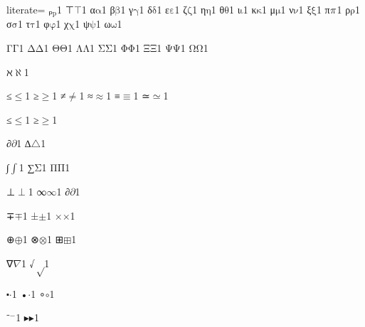 {%
literate=
{ₚ}{{\ensuremath{_\mathrm{p}}}}1
{⊤}{{\ensuremath{\top}}}1
{α}{{\ensuremath{\mathrm{\alpha}}}}1
{β}{{\ensuremath{\mathrm{\beta}}}}1
{γ}{{\ensuremath{\mathrm{\gamma}}}}1
{δ}{{\ensuremath{\mathrm{\delta}}}}1
{ε}{{\ensuremath{\mathrm{\varepsilon}}}}1
{ζ}{{\ensuremath{\mathrm{\zeta}}}}1
{η}{{\ensuremath{\mathrm{\eta}}}}1
{θ}{{\ensuremath{\mathrm{\theta}}}}1
{ι}{{\ensuremath{\mathrm{\iota}}}}1
{κ}{{\ensuremath{\mathrm{\kappa}}}}1
{μ}{{\ensuremath{\mathrm{\mu}}}}1
{ν}{{\ensuremath{\mathrm{\nu}}}}1
{ξ}{{\ensuremath{\mathrm{\xi}}}}1
{π}{{\ensuremath{\mathrm{\mathnormal{\pi}}}}}1
{ρ}{{\ensuremath{\mathrm{\rho}}}}1
{σ}{{\ensuremath{\mathrm{\sigma}}}}1
{τ}{{\ensuremath{\mathrm{\tau}}}}1
{φ}{{\ensuremath{\mathrm{\varphi}}}}1
{χ}{{\ensuremath{\mathrm{\chi}}}}1
{ψ}{{\ensuremath{\mathrm{\psi}}}}1
{ω}{{\ensuremath{\mathrm{\omega}}}}1

{Γ}{{\ensuremath{\mathrm{\Gamma}}}}1
{Δ}{{\ensuremath{\mathrm{\Delta}}}}1
{Θ}{{\ensuremath{\mathrm{\Theta}}}}1
{Λ}{{\ensuremath{\mathrm{\Lambda}}}}1
{Σ}{{\ensuremath{\mathrm{\Sigma}}}}1
{Φ}{{\ensuremath{\mathrm{\Phi}}}}1
{Ξ}{{\ensuremath{\mathrm{\Xi}}}}1
{Ψ}{{\ensuremath{\mathrm{\Psi}}}}1
{Ω}{{\ensuremath{\mathrm{\Omega}}}}1

{ℵ}{{\ensuremath{\aleph}}}1

{≤}{{\ensuremath{\leq}}}1
{≥}{{\ensuremath{\geq}}}1
{≠}{{\ensuremath{\neq}}}1
{≈}{{\ensuremath{\approx}}}1
{≡}{{\ensuremath{\equiv}}}1
{≃}{{\ensuremath{\simeq}}}1

{≤}{{\ensuremath{\leq}}}1
{≥}{{\ensuremath{\geq}}}1

{∂}{{\ensuremath{\partial}}}1
{∆}{{\ensuremath{\triangle}}}1 %

{∫}{{\ensuremath{\int}}}1
{∑}{{\ensuremath{\mathrm{\Sigma}}}}1
{Π}{{\ensuremath{\mathrm{\Pi}}}}1

{⊥}{{\ensuremath{\perp}}}1
{∞}{{\ensuremath{\infty}}}1
{∂}{{\ensuremath{\partial}}}1

{∓}{{\ensuremath{\mp}}}1
{±}{{\ensuremath{\pm}}}1
{×}{{\ensuremath{\times}}}1

{⊕}{{\ensuremath{\oplus}}}1
{⊗}{{\ensuremath{\otimes}}}1
{⊞}{{\ensuremath{\boxplus}}}1

{∇}{{\ensuremath{\nabla}}}1
{√}{{\ensuremath{\sqrt}}}1

{⬝}{{\ensuremath{\cdot}}}1
{•}{{\ensuremath{\cdot}}}1
{∘}{{\ensuremath{\circ}}}1

{⁻}{{\ensuremath{^{-}}}}1
{▸}{{\ensuremath{\blacktriangleright}}}1

}

